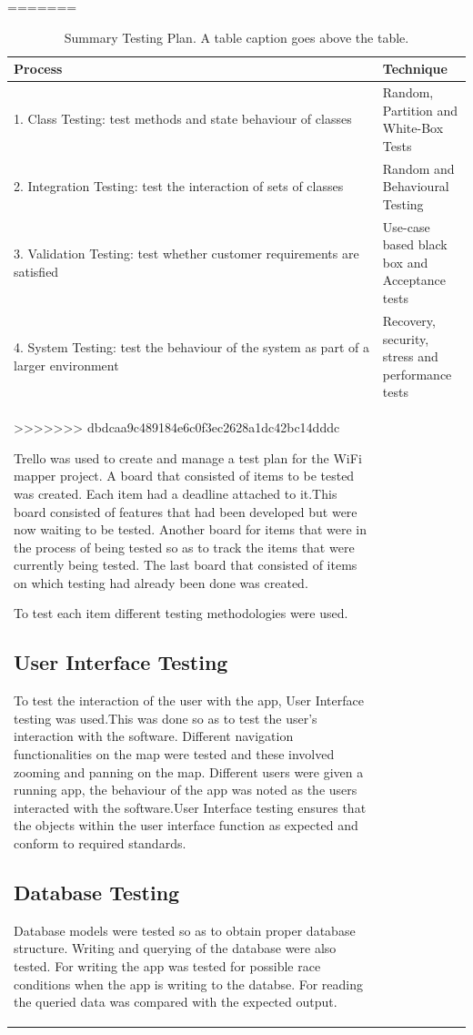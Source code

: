 =======
\begin{table}[h!]
  \centering
\caption{Summary Testing Plan. A table caption goes above the table.}
\begin{tabular}[t]{|p{8cm}|p{7cm}|} \hline
  \textbf{Process} & \textbf{Technique} \\ \hline 1. Class
    Testing: test methods and state behaviour of classes & Random,
    Partition and White-Box Tests \\ \hline 2. Integration Testing:
    test the
    interaction of sets of classes & Random and Behavioural Testing \\
    \hline 3. Validation Testing: test whether customer requirements
    are satisfied & Use-case based black box and Acceptance tests \\
    \hline 4. System Testing: test the behaviour of the system as part
    of a larger environment & Recovery, security, stress and
    performance tests \\ \hline
>>>>>>> dbdcaa9c489184e6c0f3ec2628a1dc42bc14dddc


Trello was used to create and manage a test plan for the WiFi mapper project. A board that consisted of items to be tested was created. Each item had a deadline attached to it.This board consisted of features that had been developed but were now waiting to be tested. Another board for items that were in the process of being tested so as to track the items  that were currently being tested. The last board that consisted of items on which testing had already been done was created.

To test each item different testing methodologies were used.

\subsection*{User Interface Testing}
To test the interaction of the user with the app, User Interface testing was used.This was done so as to test the user's interaction with the software. Different navigation functionalities on the map were tested and these involved zooming and panning on the map. Different users were given a running app, the behaviour of the app was noted as the users interacted with the software.User Interface testing ensures that the objects within the user interface function as expected and conform to required standards.

\subsection*{Database Testing}
Database models were tested so as to obtain proper database structure. Writing and querying of the database were also tested. For writing the app was tested for possible race conditions when the app is writing to the databse. For reading the queried data was compared with the expected output.


\end{tabular}
\end{table}
